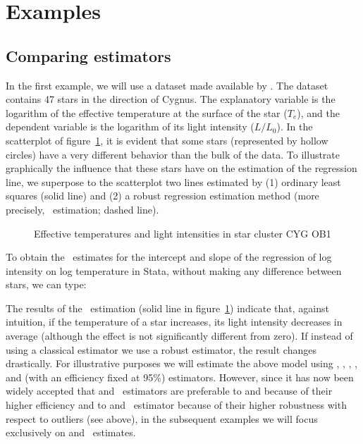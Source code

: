 \section{Examples}

\subsection{Comparing estimators} 

In the first example, we will use a dataset made available by
\citet{rousseeuw:leroy:1987}. The dataset contains 47 stars in the direction of
Cygnus. The explanatory variable is the logarithm of the effective temperature
at the surface of the star ($T_e$), and the dependent variable is the logarithm
of its light intensity ($L/L_0$). In the scatterplot of
figure~\ref{fig:stars_scatterplot}, it is evident that some stars (represented
by hollow circles) have a very different behavior than the bulk of the data. To
illustrate graphically the influence that these stars have on the estimation of
the regression line, we superpose to the scatterplot two lines estimated by (1)
ordinary least squares (solid line) and (2) a robust regression estimation
method (more precisely, ~estimation; dashed line).                  


\begin{figure}[h!]
    \centering
    \caption{Effective temperatures and light intensities in star cluster CYG OB1}
    \label{fig:stars_scatterplot}
\end{figure}


To obtain the ~estimates for the intercept and slope of the regression
of log intensity on log temperature in Stata, without making any difference 
between stars, we can type:

\begin{stlog}

\end{stlog}

The results of the ~estimation (solid line in
figure~\ref{fig:stars_scatterplot}) indicate that, against intuition, if the
temperature of a star increases, its light intensity decreases in average
(although the effect is not significantly different from zero). If instead of
using a classical estimator we use a robust estimator, the result changes
drastically. For illustrative purposes we will estimate the above model using
, , , ,  and  (with an
efficiency fixed at 95\%) estimators. However, since it has now been widely
accepted that  and ~estimators are preferable to 
and  because of their higher efficiency and to  and 
~estimator because of their higher robustness with respect to outliers (see
above), in the subsequent examples we will focus exclusively on  and
~estimates.

